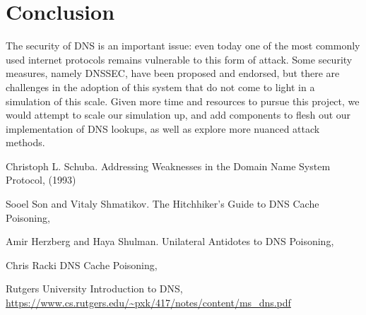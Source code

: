 \documentclass[a4paper, 12pt]{article} %
\begin{document}

\section*{Conclusion}

The security of DNS is an important issue: even today one of the most commonly used internet protocols remains vulnerable to this form of attack. Some security measures, namely DNSSEC, have been proposed and endorsed\cite{Herzberg}, but there are challenges in the adoption of this system that do not come to light in a simulation of this scale. Given more time and resources to pursue this project, we would attempt to scale our simulation up, and add components to flesh out our implementation of DNS lookups, as well as explore more nuanced attack methods.\cite{Herzberg}



%
\begin{thebibliography}{99} %

Christoph L. Schuba. 
\newblock Addressing Weaknesses in the Domain Name System Protocol,  
 (1993)

Sooel Son and Vitaly Shmatikov.
\newblock The Hitchhiker's Guide to DNS Cache Poisoning, 

Amir Herzberg and Haya Shulman.
\newblock Unilateral Antidotes to DNS Poisoning, 

Chris Racki
\newblock DNS Cache Poisoning, 

Rutgers University
\newblock Introduction to DNS,
\newblock \url{https://www.cs.rutgers.edu/~pxk/417/notes/content/ms_dns.pdf}
 
\end{thebibliography}

\end{document}
